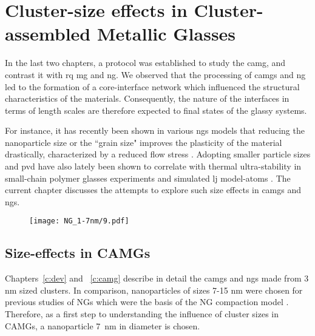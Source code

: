 \chapter{Cluster-size effects in Cluster-assembled Metallic Glasses} \label{c:cbmg}

In the last two chapters, a protocol was established to study the \gls{camg}, and contrast it with \gls{rq} \gls{mg} and \gls{ng}. We observed that the processing of \cz \gls{camg}s and \gls{ng} led to the formation of a core-interface network which influenced the structural characteristics of the materials. Consequently, the nature of the interfaces in terms of length scales are therefore expected to final states of the glassy systems. \par

For instance, it has recently been shown in various \gls{ng}s models that reducing the nanoparticle size or the ``grain size" improves the plasticity of the material drastically, characterized by a reduced flow stress \cite{Adibi2013,Adibi2014,Cheng2019a}. Adopting smaller particle sizes and \gls{pvd} have also lately been shown to correlate with thermal ultra-stability in small-chain polymer glasses experiments \cite{Raegen2020} and simulated \gls{lj} model-atoms \cite{Singh2013}. The current chapter discusses the attempts to explore such size effects in \gls{camg}s and \gls{ng}s.

\begin{figure}[!h] \centering
	\texttt{[image: NG\_1-7nm/9.pdf]}
	\label{f:clussizes}
\end{figure}

\newpage
\section{Size-effects in CAMGs}
Chapters~\ref{c:dev} and ~\ref{c:camg} describe in detail the \gls{camg}s and \gls{ng}s made from 3 nm sized clusters. %
In comparison, nanoparticles of sizes 7-15 nm were chosen for previous studies of NGs which were the basis of the NG compaction model  \cite{Adjaoud2016,Adjaoud2018,Kalcher2017,Cheng2019}. Therefore, as a first step to understanding the influence of cluster sizes in CAMGs, a \cz nanoparticle \mbox{7 nm} in diameter is chosen. \par

